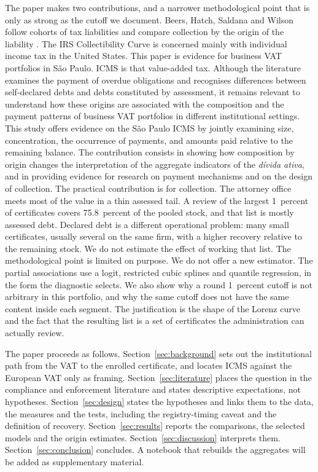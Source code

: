 The paper makes two contributions, and a narrower methodological point that is only as strong as the cutoff we document.
Beers, Hatch, Saldana and Wilson follow cohorts of tax liabilities and compare collection by the origin of the liability \citep{beers2015collectibility}.
The IRS Collectibility Curve is concerned mainly with individual income tax in the United States.
This paper is evidence for business VAT portfolios in S\~ao Paulo.
ICMS is that value-added tax.
Although the literature examines the payment of overdue obligations and recognises differences between self-declared debts and debts constituted by assessment, it remains relevant to understand how these origins are associated with the composition and the payment patterns of business VAT portfolios in different institutional settings.
This study offers evidence on the S\~ao Paulo ICMS by jointly examining size, concentration, the occurrence of payments, and amounts paid relative to the remaining balance.
The contribution consists in showing how composition by origin changes the interpretation of the aggregate indicators of the \emph{d\'ivida ativa}, and in providing evidence for research on payment mechanisms and on the design of collection.
The practical contribution is for collection.
The attorney office meets most of the value in a thin assessed tail.
A review of the largest 1~percent of certificates covers 75.8~percent of the pooled stock, and that list is mostly assessed debt.
Declared debt is a different operational problem: many small certificates, usually several on the same firm, with a higher recovery relative to the remaining stock.
We do not estimate the effect of working that list.
The methodological point is limited on purpose.
We do not offer a new estimator.
The partial associations use a logit, restricted cubic splines and quantile regression, in the form the diagnostic selects.
We also show why a round 1~percent cutoff is not arbitrary in this portfolio, and why the same cutoff does not have the same content inside each segment.
The justification is the shape of the Lorenz curve and the fact that the resulting list is a set of certificates the administration can actually review.

The paper proceeds as follows.
Section~\ref{sec:background} sets out the institutional path from the VAT to the enrolled certificate, and locates ICMS against the European VAT only as framing.
Section~\ref{sec:literature} places the question in the compliance and enforcement literature and states descriptive expectations, not hypotheses.
Section~\ref{sec:design} states the hypotheses and links them to the data, the measures and the tests, including the registry-timing caveat and the definition of recovery.
Section~\ref{sec:results} reports the comparisons, the selected models and the origin estimates.
Section~\ref{sec:discussion} interprets them.
Section~\ref{sec:conclusion} concludes.
A notebook that rebuilds the aggregates will be added as supplementary material.
